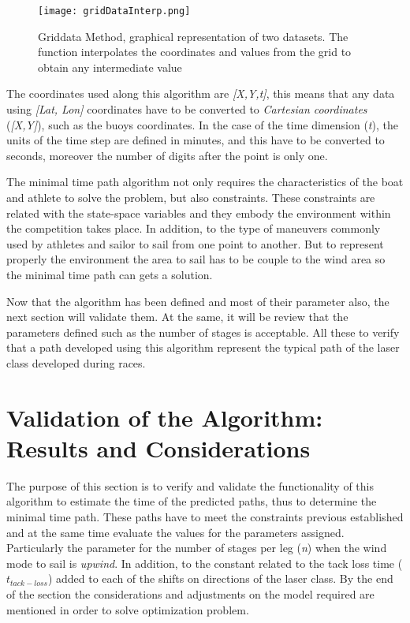 \begin{figure}[hbt!]
    \centering
    \texttt{[image: gridDataInterp.png]}
    \caption{Griddata Method, graphical representation of two datasets. The function interpolates the coordinates and values from the grid to obtain any intermediate value}
    \label{fig:gridDataInterpo}
\end{figure}

The coordinates used along this algorithm are \textit{[X,Y,t]}, this means that any data using \textit{[Lat, Lon]} coordinates have to be converted to \textit{Cartesian coordinates} (\textit{[X,Y]}), such as the buoys coordinates. In the case of the time dimension (\textit{t}), the units of the time step are defined in minutes, and this have to be converted to seconds, moreover the number of digits after the point is only one. \par

The minimal time path algorithm not only requires the characteristics of the boat and athlete to solve the problem, but also constraints. These constraints are related with the state-space variables and they embody the environment within the competition takes place. In addition, to the type of maneuvers commonly used by athletes and sailor to sail from one point to another. But to represent properly the environment the area to sail has to be couple to the wind area so the minimal time path can gets a solution. \par \noindent 
Now that the algorithm has been defined and most of their parameter also, the next section will validate them. At the same, it will be review that the parameters defined such as the number of stages is acceptable. All these to verify that a path developed using this algorithm represent the typical path of the laser class developed during races. \par %
\section{Validation of the Algorithm: Results and Considerations}
\label{sec:ValidationAlgo}

The purpose of this section is to verify and validate the functionality of this algorithm to estimate the time of the predicted paths, thus to determine the minimal time path. These paths have to meet the constraints previous established and at the same time evaluate the values for the parameters assigned. Particularly the parameter for the number of stages per leg (\textit{n}) when the wind mode to sail is \textit{upwind}. In addition, to the constant related to the tack loss time ($t_{tack-loss}$) added to each of the shifts on directions of the laser class. By the end of the section the considerations and adjustments on the model required are mentioned in order to solve optimization problem.  \par 

